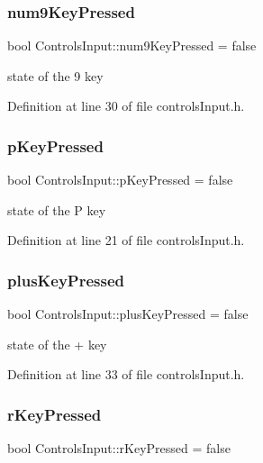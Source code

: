 \subsubsection{\texorpdfstring{num9\+Key\+Pressed}{num9KeyPressed}}
{\footnotesize\ttfamily bool Controls\+Input\+::num9\+Key\+Pressed = false}

state of the 9 key 

Definition at line 30 of file controls\+Input.\+h.

\mbox{\label{struct_controls_input_a2e027179dcc06bdb10c74ccd4e7983e6}} 
\subsubsection{\texorpdfstring{p\+Key\+Pressed}{pKeyPressed}}
{\footnotesize\ttfamily bool Controls\+Input\+::p\+Key\+Pressed = false}

state of the P key 

Definition at line 21 of file controls\+Input.\+h.

\mbox{\label{struct_controls_input_ae4cfd2052a042c57c601ba2c3ed6fec1}} 
\subsubsection{\texorpdfstring{plus\+Key\+Pressed}{plusKeyPressed}}
{\footnotesize\ttfamily bool Controls\+Input\+::plus\+Key\+Pressed = false}

state of the + key 

Definition at line 33 of file controls\+Input.\+h.

\mbox{\label{struct_controls_input_a24e3c06c9b3bbd1b6920bfd605f7390f}} 
\subsubsection{\texorpdfstring{r\+Key\+Pressed}{rKeyPressed}}
{\footnotesize\ttfamily bool Controls\+Input\+::r\+Key\+Pressed = false}

